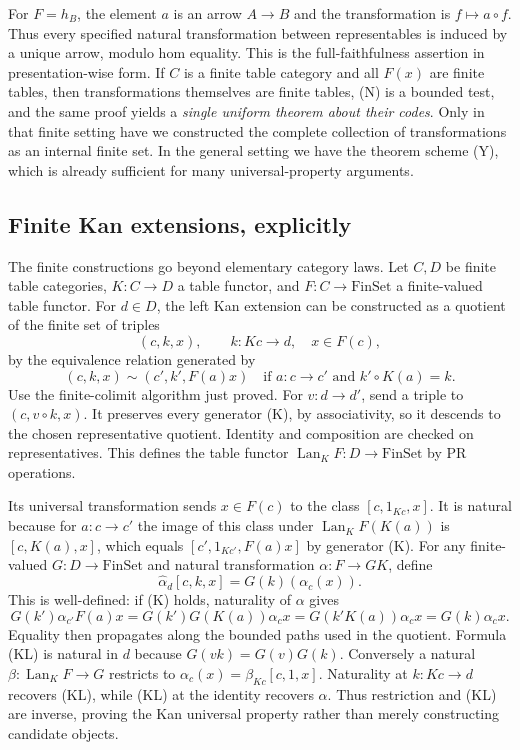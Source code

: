 For $F=h_B$, the element $a$ is an arrow $A\to B$ and the transformation is
$f\mapsto a\circ f$.  Thus every specified natural transformation between
representables is induced by a unique arrow, modulo hom equality.  This is the
full-faithfulness assertion in presentation-wise form.  If $C$ is a finite table
category and all $F(x)$ are finite tables, then transformations themselves are
finite tables, (N) is a bounded test, and the same proof yields a \emph{single
uniform theorem about their codes}.  Only in that finite setting have we
constructed the complete collection of transformations as an internal finite
set.  In the general setting we have the theorem scheme (Y), which is already
sufficient for many universal-property arguments.

\subsection{Finite Kan extensions, explicitly}

The finite constructions go beyond elementary category laws.  Let $C,D$ be
finite table categories, $K:C\to D$ a table functor, and $F:C\to\mathrm{FinSet}$
a finite-valued table functor.  For $d\in D$, the left Kan extension can be
constructed as a quotient of the finite set of triples
\[
 (c,k,x),\qquad k:Kc\to d,\quad x\in F(c),
\]
by the equivalence relation generated by
\[
 (c,k,x)\sim(c',k',F(a)x)
 \quad\text{if }a:c\to c'\text{ and }k'\circ K(a)=k.   \tag{K}
\]
Use the finite-colimit algorithm just proved.  For $v:d\to d'$, send a triple
to $(c,v\circ k,x)$.  It preserves every generator (K), by associativity, so it
descends to the chosen representative quotient.  Identity and composition are
checked on representatives.  This defines the table functor $\operatorname{Lan}_K
F:D\to\mathrm{FinSet}$ by PR operations.

Its universal transformation sends $x\in F(c)$ to the class $[c,1_{Kc},x]$.
It is natural because for $a:c\to c'$ the image of this class under
$\operatorname{Lan}_K F(K(a))$ is $[c,K(a),x]$, which equals
$[c',1_{Kc'},F(a)x]$ by generator (K).
For any finite-valued $G:D\to\mathrm{FinSet}$ and natural transformation
$\alpha:F\to GK$, define
\[
 \widehat\alpha_d[c,k,x]=G(k)(\alpha_c(x)).            \tag{KL}
\]
This is well-defined: if (K) holds, naturality of $\alpha$ gives
\[
 G(k')\alpha_{c'}F(a)x
   =G(k')G(K(a))\alpha_cx
   =G(k'K(a))\alpha_cx
   =G(k)\alpha_cx.
\]
Equality then propagates along the bounded paths used in the quotient.  Formula
(KL) is natural in $d$ because $G(vk)=G(v)G(k)$.  Conversely a natural
$\beta:\operatorname{Lan}_K F\to G$ restricts to
$\alpha_c(x)=\beta_{Kc}[c,1,x]$.  Naturality at $k:Kc\to d$ recovers (KL), while
(KL) at the identity recovers $\alpha$.  Thus restriction and (KL) are inverse,
proving the Kan universal property rather than merely constructing candidate
objects.

